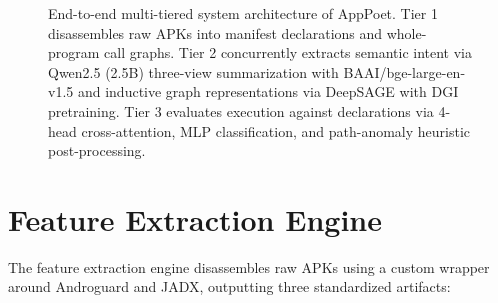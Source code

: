 \documentclass[12pt,a4paper,oneside]{report}
\begin{document}
\begin{figure}[htbp]
{\begin{tikzpicture}
\end{tikzpicture}%
}
\caption{End-to-end multi-tiered system architecture of AppPoet. Tier 1 disassembles raw APKs into manifest declarations and whole-program call graphs. Tier 2 concurrently extracts semantic intent via Qwen2.5 (2.5B) three-view summarization with BAAI/bge-large-en-v1.5 and inductive graph representations via DeepSAGE with DGI pretraining. Tier 3 evaluates execution against declarations via 4-head cross-attention, MLP classification, and path-anomaly heuristic post-processing.}\label{fig:system_architecture}
\end{figure}

\section{Feature Extraction Engine}
The feature extraction engine disassembles raw APKs using a custom wrapper around Androguard and JADX, outputting three standardized artifacts:
\end{document}
